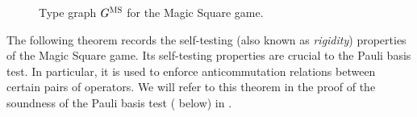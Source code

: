 \documentclass[11pt]{article}
\theoremstyle{definition}
\newcommand{\gamestyle}[1]{\ensuremath{\textsc{#1}}\xspace}
\newcommand{\ms}{\gamestyle{MS}}
\newcommand{\typestyle}[1]{\ensuremath{\textsc{#1}}\xspace}
\newcommand{\Constraint}{\typestyle{Constraint}}
\newcommand{\Variable}{\typestyle{Variable}}
\begin{document}
\begin{figure}[!htbp]
  \centering
  \caption{Type graph $G^\ms$ for the Magic Square game.  }
  \label{fig:type-graph-ms}
\end{figure}

The following theorem records the self-testing (also known as \emph{rigidity})
properties of the Magic Square game.
Its self-testing properties
are crucial to the Pauli basis test.
In particular, it is used to enforce anticommutation relations between certain
pairs of operators.
We will refer to this theorem in the proof of the soundness of the Pauli basis test ( below) in .
\end{document}
